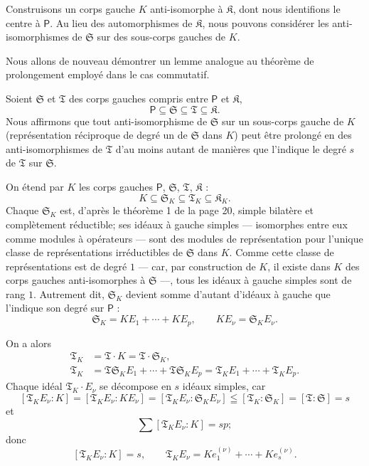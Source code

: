 Construisons un corps gauche \(K\) anti-isomorphe à \(\mathfrak K\), dont nous identifions le centre à \(\mathsf P\). Au lieu des automorphismes de \(\mathfrak K\), nous pouvons considérer les anti-isomorphismes de \(\mathfrak S\) sur des sous-corps gauches de \(K\).

Nous allons de nouveau démontrer un lemme analogue au théorème de prolongement employé dans le cas commutatif.

Soient \(\mathfrak S\) et \(\mathfrak T\) des corps gauches compris entre \(\mathsf P\) et \(\mathfrak K\),
\[
\mathsf P \subseteq \mathfrak S \subseteq \mathfrak T \subseteq \mathfrak K.
\]
Nous affirmons que tout anti-isomorphisme de \(\mathfrak S\) sur un sous-corps gauche de \(K\) (représentation réciproque de degré un de \(\mathfrak S\) dans \(K\)) peut être prolongé en des anti-isomorphismes de \(\mathfrak T\) d'au moins autant de manières que l'indique le degré \(s\) de \(\mathfrak T\) sur \(\mathfrak S\).

On étend par \(K\) les corps gauches \(\mathsf P\), \(\mathfrak S\), \(\mathfrak T\), \(\mathfrak K\) :
\[
K\subseteq \mathfrak S_K\subseteq \mathfrak T_K\subseteq \mathfrak K_K.
\]
Chaque \(\mathfrak S_K\) est, d'après le théorème 1 de la page 20, simple bilatère et complètement réductible; ses idéaux à gauche simples --- isomorphes entre eux comme modules à opérateurs --- sont des modules de représentation pour l'unique classe de représentations irréductibles de \(\mathfrak S\) dans \(K\). Comme cette classe de représentations est de degré \(1\) --- car, par construction de \(K\), il existe dans \(K\) des corps gauches anti-isomorphes à \(\mathfrak S\) ---, tous les idéaux à gauche simples sont de rang \(1\). Autrement dit, \(\mathfrak S_K\) devient somme d'autant d'idéaux à gauche que l'indique son degré sur \(\mathsf P\) :
\[
\mathfrak S_K=K E_1+\cdots+K E_p,
\qquad K E_\nu=\mathfrak S_K E_\nu.
\]

On a alors
\[
\begin{aligned}
\mathfrak T_K&=\mathfrak T\cdot K=\mathfrak T\cdot \mathfrak S_K,\\
\mathfrak T_K&=\mathfrak T\mathfrak S_K E_1+\cdots+\mathfrak T\mathfrak S_K E_p
              =\mathfrak T_K E_1+\cdots+\mathfrak T_K E_p.
\end{aligned}
\]
Chaque idéal \(\mathfrak T_K\cdot E_\nu\) se décompose en \(s\) idéaux simples, car
\[
[\mathfrak T_K E_\nu:K]=[\mathfrak T_K E_\nu:K E_\nu]
=[\mathfrak T_K E_\nu:\mathfrak S_K E_\nu]
\leqq[\mathfrak T_K:\mathfrak S_K]=[\mathfrak T:\mathfrak S]=s
\]
et
\[
\sum [\mathfrak T_K E_\nu:K]=sp;
\]
donc
\[
[\mathfrak T_K E_\nu:K]=s,
\qquad
\mathfrak T_K E_\nu=K e_1^{(\nu)}+\cdots+K e_s^{(\nu)}.
\]

